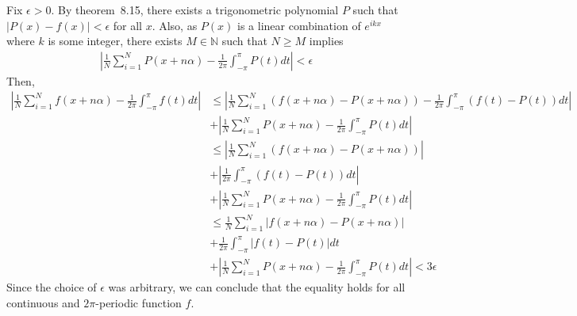 \documentclass{scrartcl}
\begin{document}
Fix \(\epsilon > 0\). By theorem~8.15, there exists a trigonometric polynomial
\(P\) such that \(|P(x) - f(x)| < \epsilon\) for all \(x\). Also, as \(P(x)\)
is a linear combination of \(e^{ikx}\) where \(k\) is some integer, there
exists \(M \in \mathbb{N}\) such that \(N \ge M\) implies
\begin{align*}
  \left| \frac{1}{N} \sum^N_{i = 1} P(x + n\alpha)
    - \frac{1}{2\pi} \int^\pi_{-\pi} P(t) dt \right|
  < \epsilon
\end{align*}
Then,
\begin{align*}
  \left| \frac{1}{N} \sum^N_{i = 1} f(x + n\alpha)
    - \frac{1}{2\pi} \int^\pi_{-\pi} f(t) dt \right|
  &\le \left| \frac{1}{N} \sum^N_{i = 1} (f(x + n\alpha) - P(x + n\alpha))
    - \frac{1}{2\pi} \int^\pi_{-\pi} (f(t) - P(t)) dt \right| \\
  &+ \left| \frac{1}{N} \sum^N_{i = 1} P(x + n\alpha)
    - \frac{1}{2\pi} \int^\pi_{-\pi} P(t) dt \right| \\
  &\le \left| \frac{1}{N} \sum^N_{i = 1}
    (f(x + n\alpha) - P(x + n\alpha)) \right| \\
  &+ \left| \frac{1}{2\pi} \int^\pi_{-\pi} (f(t) - P(t)) dt \right| \\
  &+ \left| \frac{1}{N} \sum^N_{i = 1} P(x + n\alpha)
    - \frac{1}{2\pi} \int^\pi_{-\pi} P(t) dt \right| \\
  &\le \frac{1}{N} \sum^N_{i = 1}
    |f(x + n\alpha) - P(x + n\alpha)| \\
  &+ \frac{1}{2\pi} \int^\pi_{-\pi} |f(t) - P(t)| dt \\
  &+ \left| \frac{1}{N} \sum^N_{i = 1} P(x + n\alpha)
    - \frac{1}{2\pi} \int^\pi_{-\pi} P(t) dt \right|
  < 3\epsilon
\end{align*}
Since the choice of \(\epsilon\) was arbitrary, we can conclude that the
equality holds for all continuous and \(2\pi\)-periodic function \(f\).
\end{document}
